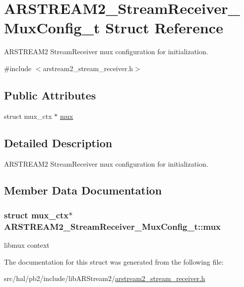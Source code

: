 \hypertarget{struct_a_r_s_t_r_e_a_m2___stream_receiver___mux_config__t}{}\section{A\+R\+S\+T\+R\+E\+A\+M2\+\_\+\+Stream\+Receiver\+\_\+\+Mux\+Config\+\_\+t Struct Reference}
\label{struct_a_r_s_t_r_e_a_m2___stream_receiver___mux_config__t}


A\+R\+S\+T\+R\+E\+A\+M2 Stream\+Receiver mux configuration for initialization.  




{\ttfamily \#include $<$arstream2\+\_\+stream\+\_\+receiver.\+h$>$}

\subsection*{Public Attributes}
\begin{DoxyCompactItemize}
\item 
struct mux\+\_\+ctx $\ast$ \hyperlink{struct_a_r_s_t_r_e_a_m2___stream_receiver___mux_config__t_ae8bacf2d18d53a103ce5abd8ea7ec00f}{mux}
\end{DoxyCompactItemize}


\subsection{Detailed Description}
A\+R\+S\+T\+R\+E\+A\+M2 Stream\+Receiver mux configuration for initialization. 

\subsection{Member Data Documentation}
\subsubsection[{\texorpdfstring{mux}{mux}}]{\setlength{\rightskip}{0pt plus 5cm}struct mux\+\_\+ctx$\ast$ A\+R\+S\+T\+R\+E\+A\+M2\+\_\+\+Stream\+Receiver\+\_\+\+Mux\+Config\+\_\+t\+::mux}\hypertarget{struct_a_r_s_t_r_e_a_m2___stream_receiver___mux_config__t_ae8bacf2d18d53a103ce5abd8ea7ec00f}{}\label{struct_a_r_s_t_r_e_a_m2___stream_receiver___mux_config__t_ae8bacf2d18d53a103ce5abd8ea7ec00f}
libmux context 

The documentation for this struct was generated from the following file\+:\begin{DoxyCompactItemize}
\item 
src/hal/pb2/include/lib\+A\+R\+Stream2/\hyperlink{arstream2__stream__receiver_8h}{arstream2\+\_\+stream\+\_\+receiver.\+h}\end{DoxyCompactItemize}
